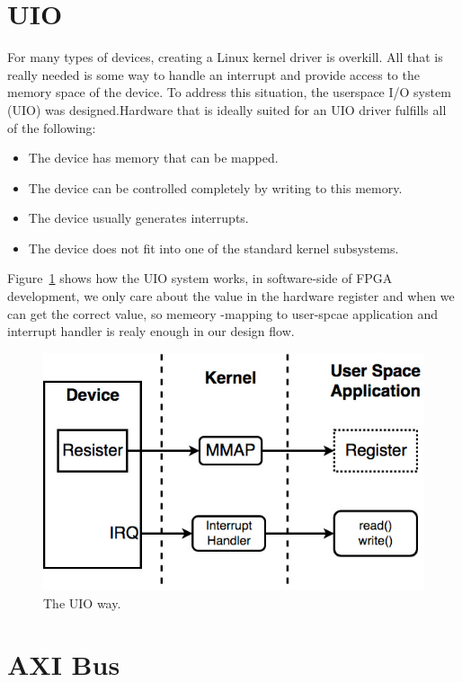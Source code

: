\section{UIO}
\label{sec:UIO}
For many types of devices, creating a Linux kernel driver is overkill. All that is really needed 
is some way to handle an interrupt and provide access to the memory space of the device. To address 
this situation, the userspace I/O system (UIO) was designed.Hardware that is ideally suited for an 
UIO driver fulfills all of the following:
%
\begin{itemize}
\item The device has memory that can be mapped.
\item The device can be controlled completely by writing to this memory.
\item The device usually generates interrupts.
\item The device does not fit into one of the standard kernel subsystems.
\end{itemize}
%
Figure~\ref{fig:UIO Driver} shows how the UIO system works, in software-side of FPGA development, we 
only care about the value in the hardware register and when we can get the correct value, so memeory
-mapping to user-spcae application and interrupt handler is realy enough in our design flow.  
%
\begin{figure}[!htb]
  \centering
  \includegraphics[scale=0.5]{images/uio.jpg}
  \caption[The UIO way.]{The UIO way.}
  \label{fig:UIO Driver}
\end{figure}

\section{AXI Bus}
\label{sec:AXI Bus}

